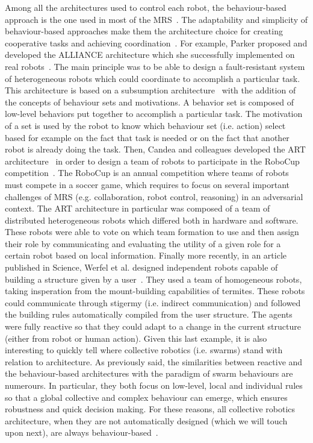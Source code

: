     Among all the architectures used to control each robot, the behaviour-based approach is the one used in most of the MRS~\cite{Arkin1998, Mataric2008, Parker2008}. The adaptability and simplicity of behaviour-based approaches make them the architecture choice for creating cooperative tasks and achieving coordination~\cite{Mataric1995, Iocchi2001}. For example, Parker proposed and developed the ALLIANCE architecture which she successfully implemented on real robots~\cite{Parker1994}. The main principle was to be able to design a fault-resistant system of heterogeneous robots which could coordinate to accomplish a particular task. This architecture is based on a subsumption architecture~\cite{Brooks1986} with the addition of the concepts of behaviour sets and motivations. A behavior set is composed of low-level behaviors put together to accomplish a particular task. The motivation of a set is used by the robot to know which behaviour set (i.e. action) select based for example on the fact that task is needed or on the fact that another robot is already doing the task. Then, Candea and colleagues developed the ART architecture~\cite{Candea2001} in order to design a team of robots to participate in the RoboCup competition~\cite{Kitano1997}. The RoboCup is an annual competition where teams of robots must compete in a soccer game, which requires to focus on several important challenges of MRS (e.g. collaboration, robot control, reasoning) in an adversarial context. The ART architecture in particular was composed of a team of distributed heterogeneous robots which differed both in hardware and software. These robots were able to vote on which team formation to use and then assign their role by communicating and evaluating the utility of a given role for a certain robot based on local information. Finally more recently, in an article published in Science, Werfel et al. designed independent robots capable of building a structure given by a user~\cite{Werfel2014}. They used a team of homogeneous robots, taking insperation from the mount-building capabilities of termites. These robots could communicate through stigermy (i.e. indirect communication) and followed the building rules automatically compiled from the user structure. The agents were fully reactive so that they could adapt to a change in the current structure (either from robot or human action). Given this last example, it is also interesting to quickly tell where collective robotics (i.e. swarms) stand with relation to architecture. As previously said, the similarities between reactive and the behaviour-based architectures with the paradigm of swarm behaviours are numerours. In particular, they both focus on low-level, local and individual rules so that a global collective and complex behaviour can emerge, which ensures robustness and quick decision making. For these reasons, all collective robotics architecture, when they are not automatically designed (which we will touch upon next), are always behaviour-based~\cite{Brambilla2012, Zoghby2013}.


